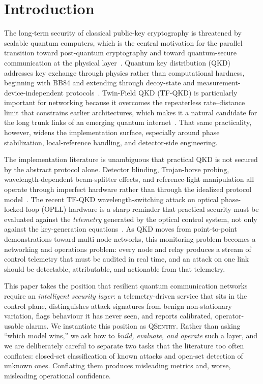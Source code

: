 \documentclass[runningheads]{llncs}
\begin{document}
\section{Introduction}
The long-term security of classical public-key cryptography is threatened by scalable quantum computers, which is the central motivation for the parallel transition toward post-quantum cryptography and toward quantum-secure communication at the physical layer~\cite{preskill2018quantum,shor1999polynomial,csrcNIST}. Quantum key distribution (QKD) addresses key exchange through physics rather than computational hardness, beginning with BB84 and extending through decoy-state and measurement-device-independent protocols~\cite{bb84,pns,hwang,lo2005,mdi}. Twin-Field QKD (TF-QKD) is particularly important for networking because it overcomes the repeaterless rate--distance limit that constrains earlier architectures, which makes it a natural candidate for the long trunk links of an emerging quantum internet~\cite{tfqkd,wehner2018internet,chen2021integrated}. That same practicality, however, widens the implementation surface, especially around phase stabilization, local-reference handling, and detector-side engineering.

The implementation literature is unambiguous that practical QKD is not secured by the abstract protocol alone. Detector blinding, Trojan-horse probing, wavelength-dependent beam-splitter effects, and reference-light manipulation all operate through imperfect hardware rather than through the idealized protocol model~\cite{lydersen,makarov,gisin,jain,li2011}. The recent TF-QKD wavelength-switching attack on optical phase-locked-loop (OPLL) hardware is a sharp reminder that practical security must be evaluated against the \emph{telemetry} generated by the optical control system, not only against the key-generation equations~\cite{peng}. As QKD moves from point-to-point demonstrations toward multi-node networks, this monitoring problem becomes a networking and operations problem: every node and relay produces a stream of control telemetry that must be audited in real time, and an attack on one link should be detectable, attributable, and actionable from that telemetry.

This paper takes the position that resilient quantum communication networks require an \emph{intelligent security layer}: a telemetry-driven service that sits in the control plane, distinguishes attack signatures from benign non-stationary variation, flags behaviour it has never seen, and reports calibrated, operator-usable alarms. We instantiate this position as \textsc{QSentry}. Rather than asking ``which model wins,'' we ask how to \emph{build, evaluate, and operate} such a layer, and we are deliberately careful to separate two tasks that the literature too often conflates: closed-set classification of known attacks and open-set detection of unknown ones. Conflating them produces misleading metrics and, worse, misleading operational confidence.
\end{document}
